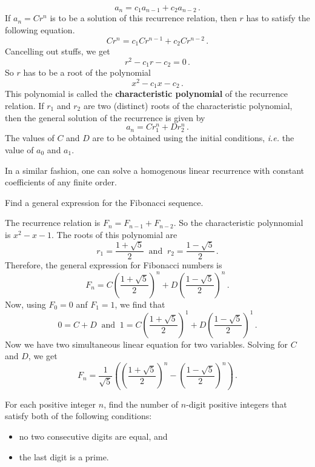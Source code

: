 \documentclass[11pt]{scrartcl}
\begin{document}
\[ a_n = c_1 a_{n-1} + c_2 a_{n-2} \, . \]
If \(a_n = C r^n\) is to be a solution of this recurrence relation, then \(r\) has to satisfy the following equation.
\[ C r^n = c_1 C r^{n-1} + c_2 C r^{n-2} \, . \]
Cancelling out stuffs, we get
\[ r^2 - c_1 r - c_2 = 0 \, . \]
So \(r\) has to be a root of the polynomial
\[ x^2 - c_1 x - c_2 \, . \]
This polynomial is called the \textbf{characteristic polynomial} of the recurrence relation. If \(r_1\) and \(r_2\) are two (distinct) roots of the characteristic polynomial, then the general solution of the recurrence is given by
\[a_n = C r_1^n +  D r_2^n \, . \]
The values of \(C\) and \(D\) are to be obtained using the initial conditions, \textit{i.e.} the value of \(a_0\) and \(a_1\).

In a similar fashion, one can solve a homogenous linear recurrence with constant coefficients of any finite order.
\begin{exercise}
Find a general expression for the Fibonacci sequence.
\end{exercise}
\begin{soln}
The recurrence relation is \(F_n = F_{n-1} + F_{n-2}\). So the characteristic polynnomial is \(x^2 -x-1\). The roots of this polynomial are
\[ r_1 = \frac{1 + \sqrt{5}}{2} \ \text{ and } \ r_2 = \frac{1 - \sqrt{5}}{2} \, .\]
Therefore, the general expression for Fibonacci numbers is
\[ F_n = C \left(\frac{1 + \sqrt{5}}{2} \right)^n + D \left(\frac{1 -\sqrt{5}}{2} \right) ^n \, .\]
Now, using \(F_0 = 0\) anf \(F_1 = 1\), we find that
\[ 0 = C+D \ \text{ and } \ 1 = C \left(\frac{1 + \sqrt{5}}{2} \right)^1 + D \left(\frac{1 -\sqrt{5}}{2} \right) ^1 \, . \]
Now we have two simultaneous linear equation for two variables. Solving for \(C\) and \(D\), we get
\[ F_n = \frac{1}{\sqrt 5} \left( \left(\frac{1 + \sqrt{5}}{2} \right)^n - \left(\frac{1 -\sqrt{5}}{2} \right) ^n \right)   \, . \]
\end{soln}
\begin{exercise}[USAJMO 2018]
For each positive integer $n$, find the number of $n$-digit positive integers that satisfy both of the following conditions:
\begin{itemize}
\item no two consecutive digits are equal, and
\item the last digit is a prime.
\end{itemize}
\end{exercise}
\end{document}

